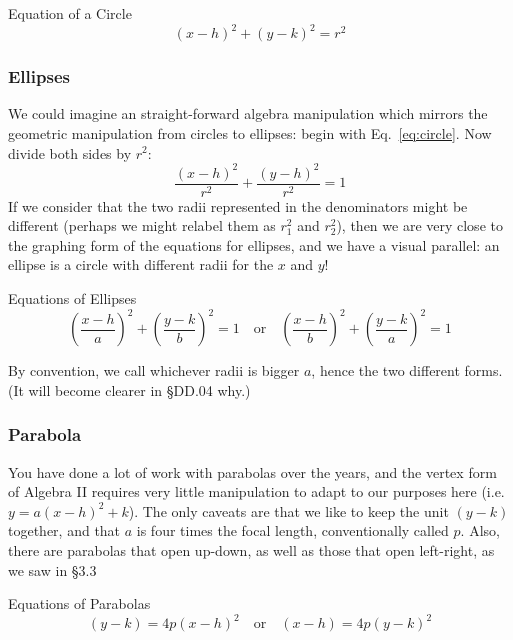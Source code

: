 \begin{derivation}{Equation of a Circle}
\label{eq:circle}
\begin{equation}
(x-h)^2+(y-k)^2=r^2
\end{equation}
\end{derivation}

\subsubsection{Ellipses}
We could imagine an straight-forward algebra manipulation which mirrors the geometric
manipulation from circles to ellipses: begin with Eq.~\ref{eq:circle}.  Now divide both sides 
by $r^2$:
$$
\frac{(x-h)^2}{r^2} + \frac{(y-h)^2}{r^2} = 1
$$
If we consider that the two radii represented in the denominators might be different 
(perhaps we might relabel them as $r_1^2$
and $r_2^2$), then we are very close to the graphing form of the equations for ellipses, and
we have a visual parallel: an ellipse is a circle with different radii for the $x$ and $y$!

\begin{derivation}{Equations of Ellipses}
\begin{equation}
\label{eq:ellipses}
\left(\frac{x-h}{a}\right)^2 + \left(\frac{y-k}{b}\right)^2 = 1 \quad \text{or} \quad \left(\frac{x-h}{b}\right)^2 + \left(\frac{y-k}{a}\right)^2 = 1
\end{equation}
\end{derivation}
By convention, we call whichever radii is bigger $a$, hence the two different forms.  (It will become
clearer in §DD.04 why.)

\subsubsection{Parabola}
You have done a lot of work with parabolas over the years, and the vertex form of Algebra II
requires very little manipulation to adapt to our purposes here (i.e. $y=a(x-h)^2+k$).  The only
caveats are that we like to keep the unit $(y-k)$ together, and that $a$ is four times the focal
length, conventionally called $p$.  Also, there are parabolas that open up-down, as well
as those that open left-right, as we saw in §3.3

\begin{derivation}{Equations of Parabolas}
\begin{equation}
(y-k) = 4p(x-h)^2 \quad  \text{or} \quad (x-h) = 4p (y-k)^2
\end{equation}
\end{derivation}

